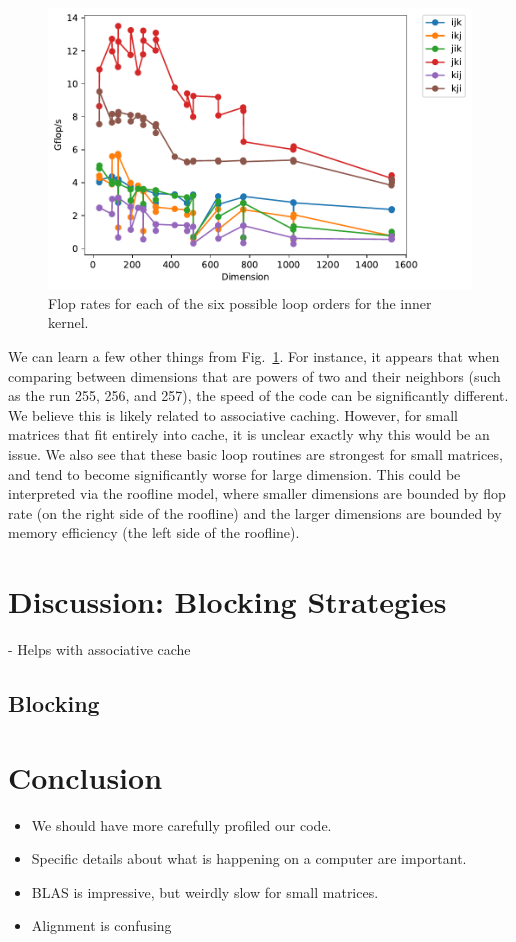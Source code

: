 \documentclass{article}
\begin{document}
\begin{figure}
    \centering
    \includegraphics[width=0.6\columnwidth]{timing_loop_order.pdf}
    \caption{Flop rates for each of the six possible loop orders for the inner kernel.}
    \label{fig:timing-loop-order}
\end{figure}

We can learn a few other things from Fig.~\ref{fig:timing-loop-order}. For instance, it appears that when comparing between dimensions that are powers of two and their neighbors (such as the run 255, 256, and 257), the speed of the code can be significantly different. We believe this is likely related to associative caching. However, for small matrices that fit entirely into cache, it is unclear exactly why this would be an issue. We also see that these basic loop routines are strongest for small matrices, and tend to become significantly worse for large dimension. This could be interpreted via the roofline model, where smaller dimensions are bounded by flop rate (on the right side of the roofline) and the larger dimensions are bounded by memory efficiency (the left side of the roofline).




\section{Discussion: Blocking Strategies}
- Helps with associative cache
\subsection{Blocking}










\section{Conclusion}
\begin{itemize}
	\item We should have more carefully profiled our code. 
	\item Specific details about what is happening on a computer are important.
	\item BLAS is impressive, but weirdly slow for small matrices.
	\item Alignment is confusing
\end{itemize}
\end{document}
